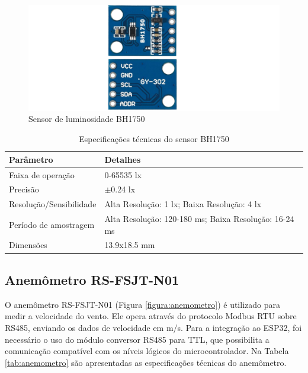 \begin{figure}[!htb] \centering
  \caption{Sensor de luminosidade BH1750} \label{figura:bh1750}
  \begin{varwidth}{\linewidth}
    \includegraphics[width=16cm]{figuras/BH1750.png}
  \end{varwidth}
\end{figure}

\begin{table}[!htb]
    \caption{Especificações técnicas do sensor BH1750}
    \begin{tabularx}{\textwidth}{|X|X|} \hline
        \textbf{Parâmetro} & \textbf{Detalhes} \\ \hline
        Faixa de operação & 0-65535 lx \\ \hline
        Precisão & $\pm$0.24 lx  \\ \hline
        Resolução/Sensibilidade & Alta Resolução: 1 lx; Baixa Resolução: 4 lx \\ \hline
        Período de amostragem & Alta Resolução: 120-180 ms; Baixa Resolução: 16-24 ms \\ \hline
        Dimensões & 13.9x18.5 mm \\ \hline
    \end{tabularx}
    \label{tab:bh1750}
\end{table}

\subsection{Anemômetro RS-FSJT-N01}

O anemômetro RS-FSJT-N01 (Figura \ref{figura:anemometro}) é utilizado para medir a velocidade do vento. Ele opera através do protocolo Modbus RTU sobre RS485, enviando os dados de velocidade em m/s. Para a integração ao ESP32, foi necessário o uso do módulo conversor RS485 para TTL, que possibilita a comunicação compatível com os níveis lógicos do microcontrolador. Na Tabela \ref{tab:anemometro} são apresentadas as especificações técnicas do anemômetro.

